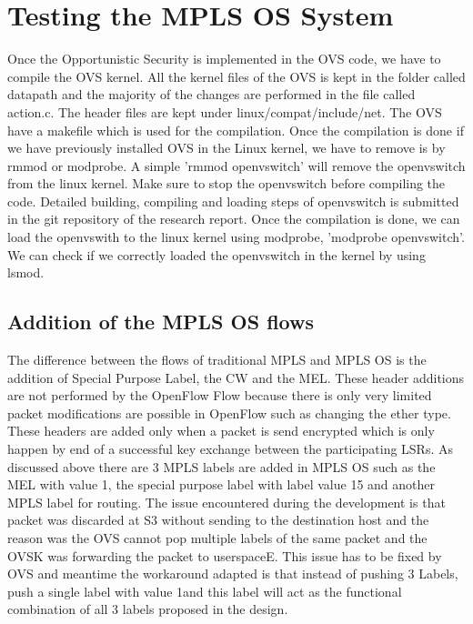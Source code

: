 \section{Testing the MPLS OS System}
Once the Opportunistic Security is implemented in the OVS code, we have to compile the OVS kernel. All the kernel files of the OVS is kept in the folder called datapath and the majority of the changes are performed in the file called action.c. The header files are kept under linux/compat/include/net. The OVS have a makefile which is used for the compilation. Once the compilation is done if we have previously installed OVS in the Linux kernel, we have to remove is by rmmod or modprobe. A simple ’rmmod openvswitch’ will remove the openvswitch from the linux kernel. Make sure to stop the openvswitch before compiling the code. Detailed building, compiling and loading steps of openvswitch is submitted in the git repository of the research report. Once the compilation is done, we can load the openvswith to the linux kernel using modprobe,  ’modprobe openvswitch’. We can check if we correctly loaded the openvswitch in the kernel by using lsmod.

\subsection{Addition of the MPLS OS flows}

The difference between the flows of traditional MPLS and MPLS OS is the addition of Special Purpose Label, the CW and the MEL. These header additions are not performed by the OpenFlow Flow because there is only very limited packet modifications are possible in OpenFlow such as changing the ether type. These headers are added only when a packet is send encrypted which is only happen by end of a successful key exchange between the participating LSRs. As discussed above there are 3 MPLS labels are added in MPLS OS such as the MEL with value 1, the special purpose label with label value 15 and another MPLS label for routing. The issue encountered during the development is that packet was discarded at S3 without sending to the destination host and the reason was the OVS cannot pop multiple labels of the same packet and the OVSK was forwarding the packet to userspace\cite{OVSMail2}E. This issue has to be fixed by OVS and meantime the workaround adapted is that instead of pushing 3 Labels, push a single label with value 1and this label will act as the functional combination of all 3 labels proposed in the design.\\

